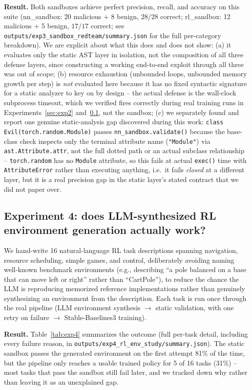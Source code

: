 \documentclass[10pt,twocolumn]{article}
\begin{document}
\textbf{Result.} Both sandboxes achieve perfect precision, recall, and
accuracy on this suite (nn\_sandbox: 20 malicious + 8 benign, $28/28$
correct; rl\_sandbox: 12 malicious + 5 benign, $17/17$ correct; see
\texttt{outputs/exp3\_sandbox\_redteam/summary.json} for the full
per-category breakdown). We are explicit about what this does and does not
show: (a) it evaluates only the static AST layer in isolation, not the
composition of all three defense layers, since constructing a working
end-to-end exploit through all three was out of scope; (b) resource
exhaustion (unbounded loops, unbounded memory growth per step) is
\emph{not} evaluated here because it has no fixed syntactic signature for a
static analyzer to key on by design -- the actual defense is the
wall-clock subprocess timeout, which we verified fires correctly during
real training runs in Experiments~\ref{sec:exp2} and~\ref{sec:exp4}, not
the sandbox; (c) we separately found and report one genuine static-analysis
gap discovered during this work: \texttt{class Evil(torch.random.Module)}
passes \texttt{nn\_sandbox.validate()} because the base-class check inspects
only the terminal attribute name (\texttt{"Module"}) via
\texttt{ast.Attribute.attr}, not the full dotted path or an actual
subclass relationship -- \texttt{torch.random} has no \texttt{Module}
attribute, so this fails at actual \texttt{exec()} time with
\texttt{AttributeError} rather than executing anything, i.e.\ it fails
\emph{closed} at a different layer, but it is a real precision gap in the
static layer's stated contract that we did not paper over.

\subsection{Experiment 4: does LLM-synthesized RL environment generation actually work?}
\label{sec:exp4}

We hand-write 16 natural-language RL task descriptions spanning navigation,
resource scheduling, simple games, and control, deliberately avoiding
naming well-known benchmark environments (e.g., describing ``a pole
balanced on a base that can move left or right'' rather than
``CartPole''), to reduce the chance the LLM is reproducing memorized
reference implementations rather than genuinely synthesizing an
environment from the description. Each task is run once through the real
pipeline (LLM environment synthesis $\to$ static validation, with one
retry on failure $\to$ Stable-Baselines3 training).

\textbf{Result.} Table~\ref{tab:exp4} summarizes the outcome (full
per-task detail, including every failure reason, in
\texttt{outputs/exp4\_rl\_env\_study/summary.json}). The static sandbox
passes the generated environment on the first attempt 81\% of the time,
but the pipeline only reaches a usable trained policy for 5 of 16 tasks
(31\%) -- most tasks that pass the sandbox still fail later, and we
tracked down why rather than leaving it as an unexplained gap.
\end{document}
